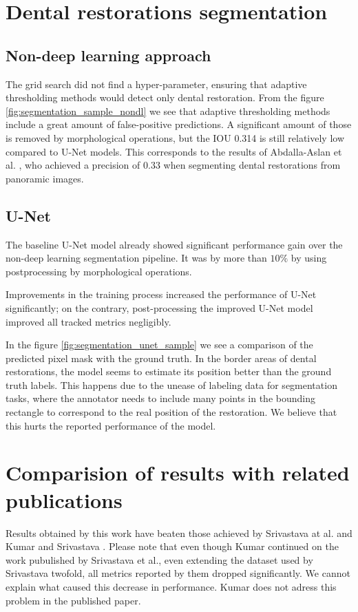 \section{Dental restorations segmentation}
\subsection{Non-deep learning approach}
The grid search did not find a hyper-parameter, ensuring that adaptive thresholding methods would detect only dental restoration. From the figure \ref{fig:segmentation_sample_nondl} we see that adaptive thresholding methods include a great amount of false-positive predictions. A significant amount of those is removed by morphological operations, but the IOU 0.314 is still relatively low compared to U-Net models. This corresponds to the results of Abdalla-Aslan et al. \cite{AbdallaAslan2020}, who achieved a precision of 0.33 when segmenting dental restorations from panoramic images.
\subsection{U-Net}
The baseline U-Net model already showed significant performance gain over the non-deep learning segmentation pipeline. It was by more than $10\%$ by using postprocessing by morphological operations.

Improvements in the training process increased the performance of U-Net significantly; on the contrary, post-processing the improved U-Net model improved all tracked metrics negligibly.

In the figure \ref{fig:segmentation_unet_sample} we see a comparison of the predicted pixel mask with the ground truth. In the border areas of dental restorations, the model seems to estimate its position better than the ground truth labels. This happens due to the unease of labeling data for segmentation tasks, where the annotator needs to include many points in the bounding rectangle to correspond to the real position of the restoration. We believe that this hurts the reported performance of the model.



\section{Comparision of results with related publications}

Results obtained by this work have beaten those achieved by Srivastava at al. \cite{Srivastava2017} and Kumar and Srivastava \cite{Kumar}. Please note that even though Kumar continued on the work pubulished by Srivastava et al., even extending the dataset used by Srivastava twofold, all metrics reported by them dropped significantly. We cannot explain what caused this decrease in performance. Kumar does not adress this problem in the published paper.

